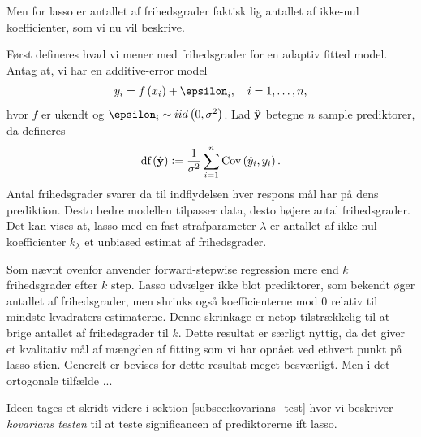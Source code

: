 Men for lasso er antallet af frihedsgrader faktisk lig antallet af ikke-nul koefficienter, som vi nu vil beskrive.

Først defineres hvad vi mener med frihedsgrader for en adaptiv fitted model. 
Antag at, vi har en additive-error model
\begin{align*}
y_i = f \del{x_i} + \epsilon_i, \quad i = 1, \ldots, n,
\end{align*}
hvor \(f\) er ukendt og \(\epsilon_i \sim iid \del{0, \sigma^2}\).
Lad \(\hat{\mathbf{y}}\) betegne \(n\) sample prediktorer, da defineres 
\begin{align*}
\text{df}\del{\hat{\y}} := \frac{1}{\sigma^2} \sum_{i=1}^n \text{Cov}\del{\hat{y}_i, y_i}.
\end{align*}
Antal frihedsgrader svarer da til indflydelsen hver respons mål har på dens prediktion.
Desto bedre modellen tilpasser data, desto højere antal frihedsgrader.
Det kan vises at, lasso med en fast strafparameter \(\lambda\) er antallet af ikke-nul koefficienter \(k_\lambda\) et unbiased estimat af frihedsgrader.

Som nævnt ovenfor anvender forward-stepwise regression mere end \(k\) frihedsgrader efter \(k\) step.
Lasso udvælger ikke blot prediktorer, som bekendt øger antallet af frihedsgrader, men shrinks også koefficienterne mod 0 relativ til mindste kvadraters estimaterne.
Denne skrinkage er netop tilstrækkelig til at brige antallet af frihedsgrader til \(k\).
Dette resultat er særligt nyttig, da det giver et kvalitativ mål af mængden af fitting som vi har opnået ved ethvert punkt på lasso stien.
Generelt er bevises for dette resultat meget besværligt.
Men i det ortogonale tilfælde ...

Ideen tages et skridt videre i sektion \ref{subsec:kovarians_test} hvor vi beskriver \textit{kovarians testen} til at teste significancen af prediktorerne ift lasso.

 